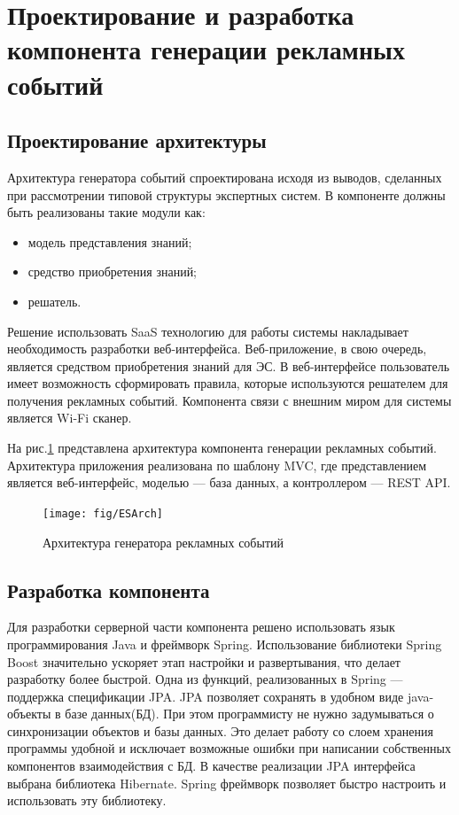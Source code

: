 \section{Проектирование и разработка компонента генерации рекламных событий}


\subsection{Проектирование архитектуры}

Архитектура генератора событий спроектирована исходя из выводов, сделанных при рассмотрении типовой структуры экспертных систем. В компоненте должны быть реализованы такие модули как:

\begin{itemize}
	\item модель представления знаний;
	\item средство приобретения знаний;
	\item решатель.
\end{itemize}

Решение использовать SaaS технологию для работы системы накладывает необходимость разработки веб-интерфейса. Веб-приложение, в свою очередь, является средством приобретения знаний для ЭС. В веб-интерфейсе пользователь имеет возможность сформировать правила, которые используются решателем для получения рекламных событий. Компонента связи с внешним миром для системы является Wi-Fi сканер.

На рис.\ref{fig:ESArch} представлена архитектура компонента генерации рекламных событий. Архитектура приложения реализована по шаблону MVC, где представлением является веб-интерфейс, моделью --- база данных, а контроллером --- REST API.

\begin{figure}[h]
	\centering
	\texttt{[image: fig/ESArch]}
	\caption{Архитектура генератора рекламных событий}
	\label{fig:ESArch}
\end{figure}

\subsection{Разработка компонента}

Для разработки серверной части компонента решено использовать язык программирования Java и фреймворк Spring. Использование библиотеки Spring Boost значительно ускоряет этап настройки и развертывания, что делает разработку более быстрой. Одна из функций, реализованных в Spring --- поддержка спецификации JPA. JPA позволяет сохранять в удобном виде java-объекты в базе данных(БД). При этом программисту не нужно задумываться о синхронизации объектов и базы данных. Это делает работу со слоем хранения программы удобной и исключает возможные ошибки при написании собственных компонентов взаимодействия с БД. В качестве реализации JPA интерфейса выбрана библиотека Hibernate. Spring фреймворк позволяет быстро настроить и использовать эту библиотеку.

